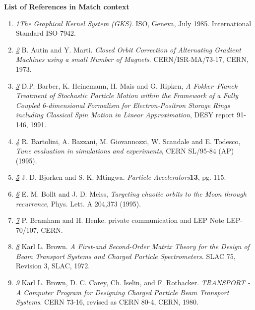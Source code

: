 

{\bf List of References in Match context}

\begin{enumerate}
   \item \href{gks}{\textit{1}}\textit{The Graphical Kernel System
     (GKS)}. ISO, Geneva, July 1985. International Standard ISO 7942.  

   \item \href{autin}{\textit{2}} B. Autin and Y. Marti. \textit{Closed
     Orbit Correction of Alternating Gradient Machines   using a small
     Number of Magnets}. CERN/ISR-MA/73-17, CERN, 1973.  


   \item \href{barber}{\textit{3}} D.P. Barber, K. Heinemann, H. Mais
     and G. Ripken, \textit{A Fokker--Planck Treatment of Stochastic
       Particle Motion within   the Framework of a Fully Coupled
       6-dimensional Formalism for   Electron-Positron Storage Rings
       including Classical Spin Motion in   Linear Approximation}, DESY
     report 91-146, 1991.  


   \item \href{bartolini}{\textit{4}} R. Bartolini, A. Bazzani,
     M. Giovannozzi, W. Scandale and E. Todesco, \textit{Tune evaluation
       in simulations and experiments}, CERN SL/95-84 (AP) (1995).  


   \item \href{bjorken}{\textit{5}} J. D. Bjorken and
     S. K. Mtingwa. \textit{Particle Accelerators}\textbf{13}, pg. 115.  


   \item \href{moon}{\textit{6}} E. M. Bollt and J. D. Meiss,
     \textit{Targeting chaotic orbits to the Moon through recurrence},
     Phys. Lett. A 204,373 (1995).  


   \item \href{bramham}{\textit{7}} P. Bramham and H. Henke. private
     communication and LEP Note LEP-70/107, CERN.  


   \item \href{slac75}{\textit{8}} Karl L. Brown. \textit{A First-and
     Second-Order Matrix Theory for the Design   of Beam Transport
     Systems and Charged Particle Spectrometers}. SLAC 75, Revision 3,
     SLAC, 1972.  

   \item \href{transport}{\textit{9}} Karl L. Brown, D. C. Carey,
     Ch. Iselin, and F. Rothacker. \textit{TRANSPORT - A Computer
       Program for Designing Charged   Particle Beam Transport
       Systems}. CERN 73-16, revised as CERN 80-4, CERN, 1980.  



\end{enumerate}
